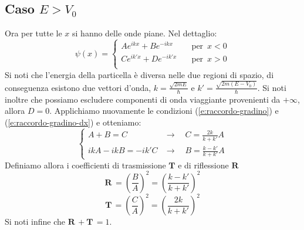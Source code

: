 \documentclass{article}
\begin{document}
\subsection{Caso \(E>V_0\)}
\label{section:gradino-high-energy}
Ora per tutte le \(x\) si hanno delle onde piane. Nel dettaglio:
\[ \psi(x) = 
\begin{cases}
 Ae^{ikx}+Be^{-ikx} &\quad \text{per } \, x<0 \\
 Ce^{ik'x}+De^{-ik'x} &\quad \text{per } \, x>0 \\
\end{cases}
\]
Si noti che l'energia della particella è diversa nelle due regioni di spazio, di conseguenza esistono due vettori d'onda, \(k=\frac{\sqrt{2mE}}{\hbar}\) e \(k'=\frac{\sqrt{2m(E-V_0)}}{\hbar}\). Si noti inoltre che possiamo escludere componenti di onda viaggiante provenienti da \(+\infty\), allora \(D = 0\).
Applichiamo nuovamente le condizioni (\ref{e:raccordo-gradino}) e (\ref{e:raccordo-gradino-dx}) e otteniamo:
\[
\begin{cases}
 A + B = C &\xrightarrow{} \quad C = \frac{2k}{k+k'}A \\
ikA -ikB = -ik'C &\xrightarrow{} \quad B = \frac{k-k'}{k+k'}A 
\end{cases}
\]
Definiamo allora i coefficienti di trasmissione \(\mathbf{T}\) e di riflessione \(\mathbf{R}\)
\[
\mathbf{R}\, =\left(\frac{B}{A}\right)^2 = \left(\frac{k-k'}{k+k'}\right)^2
\]
\[
\mathbf{T} \,=\left(\frac{C}{A}\right)^2 = \left(\frac{2k}{k+k'}\right)^2
\]
Si noti infine che \(\mathbf{R}\,+\mathbf{T}\,=1\).
\newpage
\end{document}
